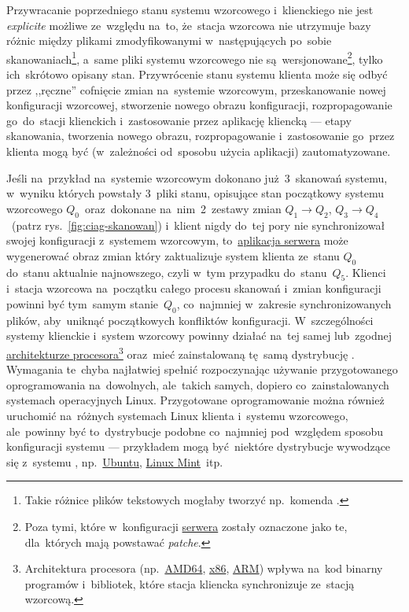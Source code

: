 \documentclass[thesis]{subfiles}
\begin{document}
Przywracanie poprzedniego stanu systemu wzorcowego i~klienckiego nie jest \emph{explicite} możliwe ze~względu na~to, że~stacja wzorcowa nie utrzymuje bazy różnic między plikami zmodyfikowanymi w~następujących po~sobie skanowaniach\footnote{Takie różnice plików tekstowych mogłaby tworzyć np.~komenda .}, a~same pliki systemu wzorcowego nie są~wersjonowane\footnote{Poza tymi, które w~konfiguracji \hyperref[sec:srv-app]{serwera} zostały oznaczone jako te, dla~których mają powstawać \emph{patche}.}, tylko ich~skrótowo opisany stan. Przywrócenie stanu systemu klienta może się odbyć przez ,,ręczne'' cofnięcie zmian na~systemie wzorcowym, przeskanowanie nowej konfiguracji wzorcowej, stworzenie nowego obrazu konfiguracji, rozpropagowanie go~do~stacji klienckich i~zastosowanie przez aplikację kliencką --- etapy skanowania, tworzenia nowego obrazu, rozpropagowanie i~zastosowanie go~przez klienta mogą być (w~zależności od~sposobu użycia aplikacji) zautomatyzowane.

Jeśli na~przykład na~systemie wzorcowym dokonano już~3~skanowań systemu, w~wyniku których powstały 3~pliki stanu, opisujące stan początkowy systemu wzorcowego $Q_0$~oraz~dokonane na~nim~2~zestawy zmian $Q_1\rightarrow Q_2$, $Q_3\rightarrow Q_4$~(patrz rys.~\ref{fig:ciag-skanowan}) i~klient nigdy do~tej pory nie synchronizował swojej konfiguracji z~systemem wzorcowym, to~\hyperref[sec:srv-app]{aplikacja serwera} może wygenerować obraz zmian który zaktualizuje system klienta ze~stanu $Q_0$ do~stanu aktualnie najnowszego, czyli w~tym przypadku do~stanu~$Q_5$. Klienci i~stacja wzorcowa na~początku całego procesu skanowań i~zmian konfiguracji powinni być tym~samym stanie~$Q_0$, co~najmniej w~zakresie synchronizowanych plików, aby~uniknąć początkowych konfliktów konfiguracji. W~szczególności systemy klienckie i~system wzorcowy powinny działać na~tej samej lub~zgodnej \href{https://en.wikipedia.org/wiki/List_of_instruction_sets}{architekturze procesora}\footnote{Architektura procesora (np.~\href{https://en.wikipedia.org/wiki/X86-64}{AMD64}, \href{https://en.wikipedia.org/wiki/X86}{x86}, \href{https://en.wikipedia.org/wiki/ARM_architecture}{ARM}) wpływa na~kod binarny programów i~bibliotek, które stacja kliencka synchronizuje ze~stacją wzorcową.} oraz~mieć zainstalowaną tę~samą dystrybucję . Wymagania te~chyba najłatwiej spełnić rozpoczynając używanie przygotowanego oprogramowania na~dowolnych, ale~takich samych, dopiero co~zainstalowanych systemach operacyjnych Linux. Przygotowane oprogramowanie można również uruchomić na~różnych systemach Linux klienta i~systemu wzorcowego, ale~powinny być to~dystrybucje podobne co~najmniej pod~względem sposobu konfiguracji systemu --- przykładem mogą być~niektóre dystrybucje wywodzące się z~systemu \debian{}, np.~\href{https://en.wikipedia.org/wiki/Ubuntu_(operating_system)}{Ubuntu}, \href{https://en.wikipedia.org/wiki/Linux_Mint}{Linux Mint}~itp.
\end{document}
